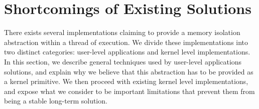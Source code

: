 \documentclass[letterpaper,twocolumn,10pt]{article}
\begin{document}
\section{Shortcomings of Existing Solutions}\label{existing}
There exists several implementations claiming to provide a memory isolation abstraction within a thread of execution.
We divide these implementations into two distinct categories: user-level applications and kernel level implementations.
In this section, we describe general techniques used by user-level applications solutions, and explain why we believe that this abstraction has to be provided as a kernel primitive.
We then proceed with existing kernel level implementations, and expose what we consider to be important limitations that prevent them from being a stable long-term solution.\\
\end{document}
